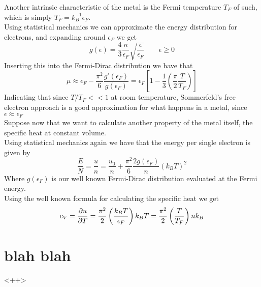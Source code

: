 \documentclass[../qm.tex]{subfiles}
\begin{document}
Another intrinsic characteristic of the metal is the Fermi temperature $T_F$ of such, which is simply $T_F=k_B^{-1}\epsilon_F$.\\
Using statistical mechanics we can approximate the energy distribution for electrons, and expanding around $\epsilon_F$ we get
\begin{equation*}
	g(\epsilon)=\frac{4}{3}\frac{n}{\epsilon_F}\sqrt{\frac{\epsilon}{\epsilon_F}}\qquad\epsilon\ge0
\end{equation*}
Inserting this into the Fermi-Dirac distribution we have that
\begin{equation*}
	\mu\approx\epsilon_F-\frac{\pi^2}{6}\frac{g'(\epsilon_F)}{g(\epsilon_F)}=\epsilon_F\left[ 1-\frac{1}{3}\left( \frac{\pi}{2}\frac{T}{T_F} \right) \right]
\end{equation*}
Indicating that since $T/T_F<<1$ at room temperature, Sommerfeld's free electron approach is a good approximation for what happens in a metal, since $\epsilon\approx\epsilon_F$\\
Suppose now that we want to calculate another property of the metal itself, the specific heat at constant volume.\\
Using statistical mechanics again we have that the energy per single electron is given by
\begin{equation*}
	\frac{E}{N}=\frac{u}{n}=\frac{u_0}{n}+\frac{\pi^2}{6}\frac{2g(\epsilon_F)}{n}\left(k_BT\right)^2
\end{equation*}
Where $g(\epsilon_F)$ is our well known Fermi-Dirac distribution evaluated at the Fermi energy.\\
Using the well known formula for calculating the specific heat we get
\begin{equation*}
	c_V=\pdv{u}{T}=\frac{\pi^2}{2}\left( \frac{k_BT}{\epsilon_F} \right)k_BT=\frac{\pi^2}{2}\left( \frac{T}{T_F} \right)nk_B
\end{equation*}
\section{blah blah}<++>
\end{document}
